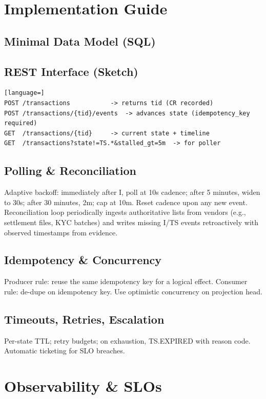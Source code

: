\documentclass[11pt]{article}
\begin{document}
\section{Implementation Guide}
\subsection{Minimal Data Model (SQL)}


\subsection{REST Interface (Sketch)}
\begin{lstlisting}[language=]
POST /transactions           -> returns tid (CR recorded)
POST /transactions/{tid}/events  -> advances state (idempotency_key required)
GET  /transactions/{tid}     -> current state + timeline
GET  /transactions?state!=TS.*&stalled_gt=5m  -> for poller
\end{lstlisting}

\subsection{Polling \& Reconciliation}
Adaptive backoff: immediately after I, poll at 10s cadence; after 5 minutes, widen to 30s; after 30 minutes, 2m; cap at 10m. Reset cadence upon any new event.
Reconciliation loop periodically ingests authoritative lists from vendors (e.g., settlement files, KYC batches) and writes missing I/TS events retroactively with observed timestamps from evidence.

\subsection{Idempotency \& Concurrency}
Producer rule: reuse the same idempotency key for a logical effect. Consumer rule: de-dupe on idempotency key. Use optimistic concurrency on projection head.

\subsection{Timeouts, Retries, Escalation}
Per-state TTL; retry budgets; on exhaustion, TS.EXPIRED with reason code. Automatic ticketing for SLO breaches.

\section{Observability \& SLOs}
\end{document}
